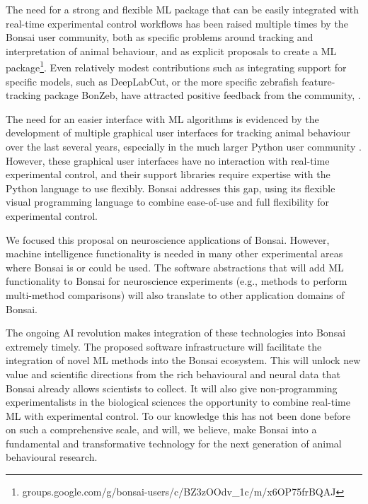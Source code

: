 The need for a strong and
flexible ML package that can be easily integrated with
real-time experimental control workflows has been raised multiple times by the
Bonsai user community, both as specific problems around 
tracking and interpretation of animal behaviour, and as 
explicit proposals to create a ML
package\footnote{groups.google.com/g/bonsai-users/c/BZ3zOOdv\_1c/m/x6OP75frBQAJ}. Even
relatively modest contributions such as integrating support for specific models, such as DeepLabCut, or the more specific zebrafish feature-tracking package BonZeb, have attracted positive
feedback from the community, \citep[e.g.,][]{kaneEtAl20,guilbeaultEtAl21}.

The need for an easier interface with ML algorithms
is evidenced by the development of multiple graphical user interfaces for
tracking animal behaviour over the last several years, especially in the much
larger Python user community
\citep[e.g.,][]{walterAndCouzin21,guilbeaultEtAl21}. However, these graphical
user interfaces have no interaction with real-time experimental control, and
their support libraries require expertise with the Python language
to use flexibly. Bonsai addresses this gap, using its
flexible visual programming language to combine ease-of-use and full
flexibility for experimental control.

We focused this proposal on neuroscience applications of Bonsai. However, machine intelligence functionality is needed in many other
experimental areas where Bonsai is or could be used. The software
abstractions that will add ML
functionality to Bonsai for neuroscience experiments (e.g., methods to perform
multi-method comparisons) will also translate to other application domains of
Bonsai.

The ongoing AI revolution makes integration of these
technologies into Bonsai extremely timely. The proposed software infrastructure will facilitate the integration of novel ML methods into the Bonsai
ecosystem. This will unlock new value
and scientific directions from the rich behavioural and neural data that Bonsai already allows scientists to collect. It will also give non-programming experimentalists in the biological
sciences the opportunity to combine real-time ML with
experimental control. To our knowledge
this has not been done before on such a comprehensive scale, and will, we believe, make Bonsai into a fundamental and transformative technology for
the next generation of animal behavioural research.

